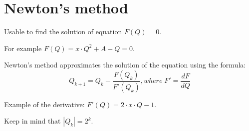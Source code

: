 \section*{Newton's method}

Usable to find the solution of equation $F(Q) = 0$.

For example $F(Q) = x \cdot Q^2 + A - Q = 0$.

Newton's method approximates the solution of the equation using the formula: 
$$Q_{k + 1} = Q_{k} - \frac{F(Q_k)}{F'(Q_k)}, where\; F' = \frac{dF}{dQ}$$

Example of the derivative: $F'(Q) = 2 \cdot x \cdot Q - 1$.

Keep in mind that $|Q_{k}| = 2^k$.

